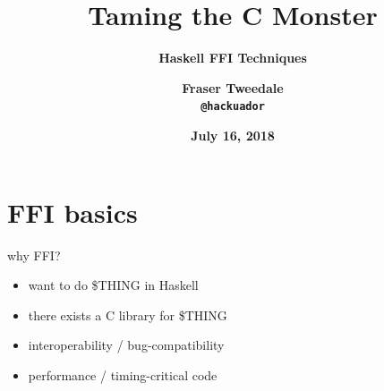 \documentclass[ignorenonframetext,aspectratio=169]{beamer}
\title{\bf Taming the C Monster}
\subtitle{\bf Haskell FFI Techniques}
\author{\bf Fraser Tweedale\\
    \texttt{@hackuador}}
\date{\bf July 16, 2018}
\providecommand{\tightlist}{%
  \setlength{\itemsep}{0pt}\setlength{\parskip}{0pt}}
\begin{document}
\begin{frame}
\titlepage
\end{frame}

\begin{frame}[plain]
\begin{center}
\end{center}
\end{frame}

\begin{frame}[plain]
\begin{center}
\end{center}
\end{frame}

\begin{frame}[plain]
\begin{center}
\end{center}
\end{frame}

\begin{frame}[plain]
\begin{center}
\end{center}
\end{frame}

\begin{frame}[plain]
\begin{center}
\end{center}
\end{frame}

\section{FFI basics}\label{ffi-basics}

\begin{frame}{why FFI?}

\begin{itemize}
\tightlist
\item
  want to do \$THING in Haskell
\item
  there exists a C library for \$THING
\item
  interoperability / bug-compatibility
\item
  performance / timing-critical code
\end{itemize}

\end{frame}
\end{document}
